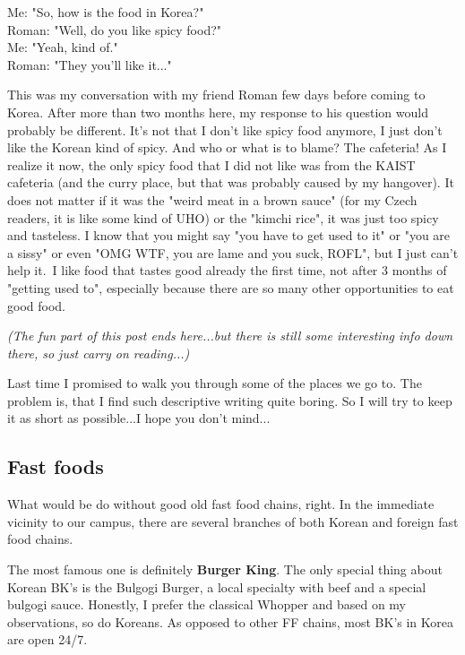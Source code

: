 \begin{post}
	\begin{content}
\begin{blockquote}Me: "So, how is the food in Korea?"\\
Roman: "Well, do you like spicy food?"\\
Me: "Yeah, kind of."\\
Roman: "They you'll like it..."\end{blockquote}

This was my conversation with my friend Roman few days before coming to Korea. After more than two months here, my response to his question would probably be different. It's not that I don't like spicy food anymore, I just don't like the Korean kind of spicy. And who or what is to blame? The cafeteria! As I realize it now, the only spicy food that I did not like was from the KAIST cafeteria (and the curry place, but that was probably caused by my hangover). It does not matter if it was the "weird meat in a brown sauce" (for my Czech readers, it is like some kind of UHO) or the "kimchi rice", it was just too spicy and tasteless. I know that you might say "you have to get used to it" or "you are a sissy" or even "OMG WTF, you are lame and you suck, ROFL", but I just can't help it. I like food that tastes good already the first time, not after 3 months of "getting used to", especially because there are so many other opportunities to eat good food.

\textit{(The fun part of this post ends here...but there is still some interesting info down there, so just carry on reading...)}

Last time I promised to walk you through some of the places we go to. The problem is, that I find such descriptive writing quite boring. So I will try to keep it as short as possible...I hope you don't mind...

\subsection{Fast foods}
What would be do without good old fast food chains, right. In the immediate vicinity to our campus, there are several branches of both Korean and foreign fast food chains.

The most famous one is definitely \textbf{Burger King}. The only special thing about Korean BK's is the Bulgogi Burger, a local specialty with beef and a special bulgogi sauce. Honestly, I prefer the classical Whopper and based on my observations, so do Koreans. As opposed to other FF chains, most BK's in Korea are open 24/7.


\end{content}
\end{post}
